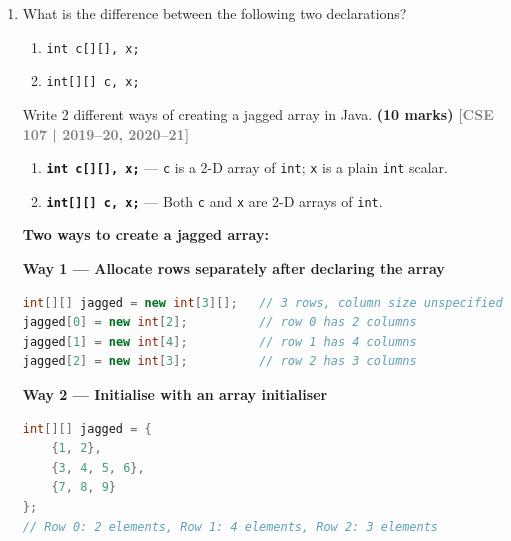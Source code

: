 \documentclass[12pt,a3paper]{article}
\newcommand{\yr}[1]{\hfill\textcolor{gray}{\small\textbf{[#1]}}}
\newcommand{\mk}[1]{\textcolor{orange!70!black}{\small\textbf{(#1 marks)}}}
\begin{document}
\begin{enumerate}
\begin{tcolorbox}
\end{tcolorbox}

\item What is the difference between the following two declarations?
\begin{enumerate}
  \item \texttt{int c[][], x;}
  \item \texttt{int[][] c, x;}
\end{enumerate}
Write 2 different ways of creating a jagged array in Java. \mk{10}
\yr{CSE 107 | 2019--20, 2020--21}

\begin{tcolorbox}[enhanced,breakable,ansbox,
  colback=cB!4,colframe=cB,boxrule=0.8pt,arc=5pt,
  title={\textbf{Answer --- 2-D Declaration Difference \& Jagged Arrays}},
  fonttitle=\bfseries\color{white},colbacktitle=cB]

\begin{enumerate}[label=(\alph*)]
  \item \textbf{\texttt{int c[][], x;}} ---
    \texttt{c} is a 2-D array of \texttt{int};
    \texttt{x} is a plain \texttt{int} scalar.

  \item \textbf{\texttt{int[][] c, x;}} ---
    Both \texttt{c} and \texttt{x} are 2-D arrays of \texttt{int}.
\end{enumerate}

\medskip
\textbf{Two ways to create a jagged array:}

\medskip
\textbf{Way 1 --- Allocate rows separately after declaring the array}

\begin{lstlisting}[language=Java]
int[][] jagged = new int[3][];   // 3 rows, column size unspecified
jagged[0] = new int[2];          // row 0 has 2 columns
jagged[1] = new int[4];          // row 1 has 4 columns
jagged[2] = new int[3];          // row 2 has 3 columns
\end{lstlisting}

\medskip
\textbf{Way 2 --- Initialise with an array initialiser}

\begin{lstlisting}[language=Java]
int[][] jagged = {
    {1, 2},
    {3, 4, 5, 6},
    {7, 8, 9}
};
// Row 0: 2 elements, Row 1: 4 elements, Row 2: 3 elements
\end{lstlisting}

\end{tcolorbox}


\end{enumerate}
\end{document}
